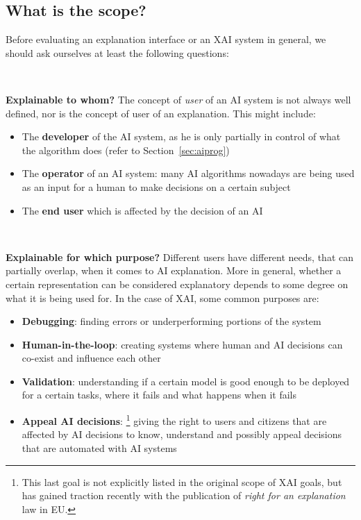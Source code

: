 \documentclass[conference]{IEEEtran}
\begin{document}
\subsection{What is the scope?}

Before evaluating an explanation interface or an XAI system in general, we
should ask ourselves at least the following questions:

\

\textbf{Explainable to whom?} The concept of \textit{user} of an AI system is
not always well defined, nor is the concept of user of an explanation. This
might include:

\begin{itemize}
    \item The \textbf{developer} of the AI system, as he is only partially in
          control of what the algorithm does (refer to Section~\ref{sec:aiprog})
    \item The \textbf{operator} of an AI system: many AI algorithms nowadays are
          being used as an input for a human to make decisions on a certain
          subject
    \item The \textbf{end user} which is affected by the decision of an AI
\end{itemize}

\

\textbf{Explainable for which purpose?} Different users have different needs,
that can partially overlap, when it comes to AI explanation. More in general,
whether a certain representation can be considered explanatory depends to some
degree on what it is being used for. In the case of XAI, some common purposes
are:

\begin{itemize}
    \item \textbf{Debugging}: finding errors or underperforming portions of the
          system
    \item \textbf{Human-in-the-loop}: creating systems where human and AI
          decisions can co-exist and influence each other
    \item \textbf{Validation}: understanding if a certain model is good enough
          to be deployed for a certain tasks, where it fails and what happens
          when it fails
    \item \textbf{Appeal AI decisions}: \footnote{This last goal is not
              explicitly listed in the original scope of XAI goals, but has
              gained traction recently with the publication of \textit{right for
                  an explanation} law in EU. } giving the right to
          users and citizens that are affected by AI decisions to know,
          understand and possibly appeal decisions that are automated with
          AI systems
\end{itemize}
\end{document}
